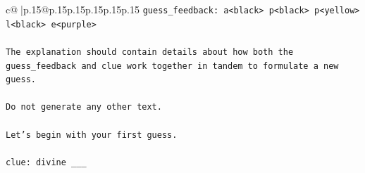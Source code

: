 \documentclass{article}
\begin{document}
{\begin{supertabular}{c@{$\;$}|p{.15\linewidth}@{}p{.15\linewidth}p{.15\linewidth}p{.15\linewidth}p{.15\linewidth}p{.15\linewidth}}
{{{\texttt{guess\_feedback: a<black> p<black> p<yellow> l<black> e<purple>} \\
\\ 
\texttt{The explanation should contain details about how both the guess\_feedback and clue work together in tandem to formulate a new guess.} \\
\\ 
\texttt{Do not generate any other text.} \\
\\ 
\texttt{Let's begin with your first guess.} \\
\\ 
\texttt{clue: divine \_\_\_} \\
            }
        }
    }
     \\ \\


\end{supertabular}}
\end{document}
